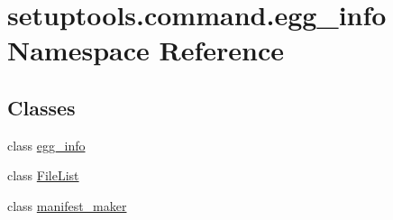 \hypertarget{namespacesetuptools_1_1command_1_1egg__info}{}\section{setuptools.\+command.\+egg\+\_\+info Namespace Reference}
\label{namespacesetuptools_1_1command_1_1egg__info}
\subsection*{Classes}
\begin{DoxyCompactItemize}
\item 
class \hyperlink{classsetuptools_1_1command_1_1egg__info_1_1egg__info}{egg\+\_\+info}
\item 
class \hyperlink{classsetuptools_1_1command_1_1egg__info_1_1_file_list}{File\+List}
\item 
class \hyperlink{classsetuptools_1_1command_1_1egg__info_1_1manifest__maker}{manifest\+\_\+maker}
\end{DoxyCompactItemize}
